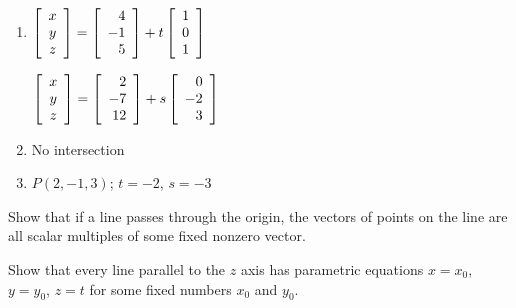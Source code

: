 \begin{multicols}{2}
\begin{ex}
\begin{enumerate}[label={\alph*.}]
\item 
$\left[
\begin{array}{c}
x\\
y\\
z
\end{array}
\right]
=
\left[
\begin{array}{r}
4\\
-1\\
5
\end{array}
\right]
+ t
\left[
\begin{array}{r}
1\\
0\\
1
\end{array}
\right]$

$\left[
\begin{array}{c}
x\\
y\\
z
\end{array}
\right]
=
\left[
\begin{array}{r}
2\\
-7\\
12
\end{array}
\right]
+ s
\left[
\begin{array}{r}
0\\
-2\\
3
\end{array}
\right]$

\end{enumerate}
\begin{sol}
\begin{enumerate}[label={\alph*.}]
\setcounter{enumi}{1}
\item  No intersection

\setcounter{enumi}{3}
\item  $P(2, -1, 3)$; $t = -2$, $s = -3$

\end{enumerate}
\end{sol}
\end{ex}

\begin{ex}
Show
 that if a line passes through the origin, the vectors of points on the 
line are all scalar multiples of some fixed nonzero vector.
\end{ex}

\begin{ex}
Show that every line parallel to the $z$ axis has parametric equations $x = x_{0}$, $y = y_{0}$, $z = t$ for some fixed numbers $x_{0}$ and $y_{0}$.
\end{ex}


\end{multicols}

